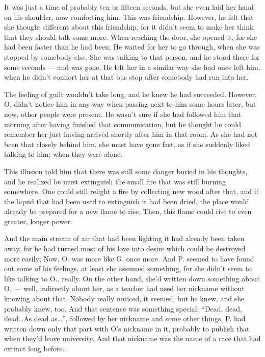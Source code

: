 It was just a time of probably ten or fifteen seconds, but she even laid her hand on his shoulder, now comforting him. This was friendship. 
However, he felt that she thought different about this friendship, for it didn't seem to make her think that they should talk some more. When reaching the door, she opened it, for she had been faster than he had been; He waited for her to go through, when she was stopped by somebody else. She was talking to that person, and he stood there for some seconds --- and was gone. 
He left her in a similar way she had once left him, when he didn't comfort her at that bus stop after somebody had run into her.

The feeling of guilt wouldn't take long, and he knew he had succeeded. However, O. didn't notice him in any way when passing next to him some hours later, but now, other people were present. He wasn't sure if she had followed him that morning after having finished that communication, but he thought he could remember her just having arrived shortly after him in that room. As she had not been that closely behind him, she must have gone fast, as if she suddenly liked talking to him; when they were alone.

This illusion told him that there was still some danger buried in his thoughts, and he realized he must extinguish the small fire that was still burning somewhere. 
One could still relight a fire by collecting new wood after that, and if the liquid that had been used to extinguish it had been dried, the place would already be prepared for a new flame to rise. Then, this flame could rise to even greater, longer power.

And the main stream of air that had been lighting it had already been taken away, for he had turned most of his love into desire which could be destroyed more easily; Now, O. was more like G. once more. 
And P. seemed to have found out some of his feelings, at least she assumed something, for she didn't seem to like talking to O., really. On the other hand, she'd written down something about O. --- well, indirectly about her, as a teacher had used her nickname without knowing about that. Nobody really noticed, it seemed, but he knew, and she probably knew, too. And that sentence was something special: \enquote{Dead, dead, dead\ldots As dead as\ldots}, followed by her nickname and some other things. P. had written down only that part with O's nickname in it, probably to publish that when they'd leave university. And that nickname was the name of a race that had extinct long before\ldots

